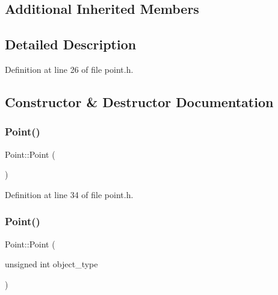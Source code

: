 \subsection*{Additional Inherited Members}


\subsection{Detailed Description}


Definition at line 26 of file point.\+h.



\subsection{Constructor \& Destructor Documentation}
\mbox{\label{class_point_ad92f2337b839a94ce97dcdb439b4325a}} 
\subsubsection{\texorpdfstring{Point()}{Point()}\hspace{0.1cm}{\footnotesize\ttfamily [1/4]}}
{\footnotesize\ttfamily Point\+::\+Point (\begin{DoxyParamCaption}{ }\end{DoxyParamCaption})\hspace{0.3cm}{\ttfamily [inline]}}



Definition at line 34 of file point.\+h.

\mbox{\label{class_point_a84d29a0f72e67406901cb87c1d2f77e9}} 
\subsubsection{\texorpdfstring{Point()}{Point()}\hspace{0.1cm}{\footnotesize\ttfamily [2/4]}}
{\footnotesize\ttfamily Point\+::\+Point (\begin{DoxyParamCaption}\item[{unsigned int}]{object\+\_\+type }\end{DoxyParamCaption})\hspace{0.3cm}{\ttfamily [inline]}}



